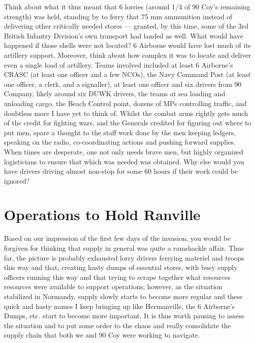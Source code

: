 \documentclass[noraggedright]{turabian-researchpaper}
\begin{document}
Think about what it thus meant that 6 lorries (around 1/4 of 90 Coy's remaining
strength) was held, standing by to ferry that 75 mm ammunition instead of 
delivering other critically needed stores --- granted, by this time, some of
the 3rd British Infantry Division's own transport had landed as well.  What
would have happened if those shells were not located?  6 Airborne would have
lost much of its artillery support.  Moreover, think about how complex it was
to locate and deliver even a single load of artillery.  Teams involved included
at least 6 Airborne's CRASC (at least one officer and a few NCOs), the Navy
Command Post (at least one officer, a clerk, and a signaller), at least one
officer and six drivers from 90 Company, likely around six DUWK drivers, the
teams at sea loading and unloading cargo, the Beach Control point, dozens of 
MPs controlling traffic, and doubtless more I have yet to think of.  Whilst 
the combat arms rightly gets much of the credit for fighting wars, and the
Generals credited for figuring out where to put men, spare a thought to the
staff work done by the men keeping ledgers, speaking on the radio, 
co-coordinating actions and pushing forward supplies.  When times are desperate, 
one not only needs brave men, but highly organized logisticians to ensure
that which was needed was obtained. Why else would you have drivers driving
almost non-stop for some 60 hours if their work could be ignored?


\section{Operations to Hold Ranville} %

Based on our impression of the first few days of the invasion, you would be 
forgiven for thinking that supply in general was quite a ramshackle affair.
Thus far, the picture is probably exhausted lorry drivers ferrying materiel and
troops this way and that, creating hasty dumps of essential stores, with busy
supply officers running this way and that trying to scrape together what 
resources resources were available to support operations; however, as the
situation stabilized in Normandy, supply slowly starts to become more regular
and these quick and hasty names I keep bringing up like Hermanville, the
6 Airborne's Dumps, etc. start to become more important.  It is thus
worth pausing to assess the situation and to put some order to the chaos and
really consolidate the supply chain that both we and 90 Coy were working to 
navigate. 
\end{document}
